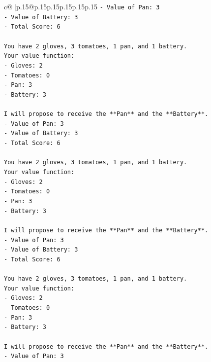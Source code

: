 \documentclass{article}
\begin{document}
{\begin{supertabular}{c@{$\;$}|p{.15\linewidth}@{}p{.15\linewidth}p{.15\linewidth}p{.15\linewidth}p{.15\linewidth}p{.15\linewidth}}
{{{\texttt{{-} Value of Pan: 3} \\
\texttt{{-} Value of Battery: 3} \\
\texttt{{-} Total Score: 6} \\
\\ 
\texttt{You have 2 gloves, 3 tomatoes, 1 pan, and 1 battery.} \\
\texttt{Your value function:} \\
\texttt{{-} Gloves: 2} \\
\texttt{{-} Tomatoes: 0} \\
\texttt{{-} Pan: 3} \\
\texttt{{-} Battery: 3} \\
\\ 
\texttt{I will propose to receive the **Pan** and the **Battery**.} \\
\texttt{{-} Value of Pan: 3} \\
\texttt{{-} Value of Battery: 3} \\
\texttt{{-} Total Score: 6} \\
\\ 
\texttt{You have 2 gloves, 3 tomatoes, 1 pan, and 1 battery.} \\
\texttt{Your value function:} \\
\texttt{{-} Gloves: 2} \\
\texttt{{-} Tomatoes: 0} \\
\texttt{{-} Pan: 3} \\
\texttt{{-} Battery: 3} \\
\\ 
\texttt{I will propose to receive the **Pan** and the **Battery**.} \\
\texttt{{-} Value of Pan: 3} \\
\texttt{{-} Value of Battery: 3} \\
\texttt{{-} Total Score: 6} \\
\\ 
\texttt{You have 2 gloves, 3 tomatoes, 1 pan, and 1 battery.} \\
\texttt{Your value function:} \\
\texttt{{-} Gloves: 2} \\
\texttt{{-} Tomatoes: 0} \\
\texttt{{-} Pan: 3} \\
\texttt{{-} Battery: 3} \\
\\ 
\texttt{I will propose to receive the **Pan** and the **Battery**.} \\
\texttt{{-} Value of Pan: 3} \\
}}}
\end{supertabular}}
\end{document}
